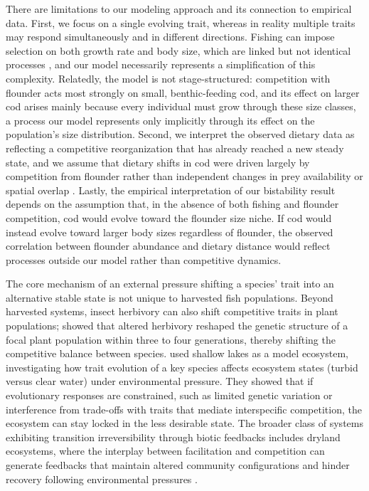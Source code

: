 \documentclass[12pt]{article}
\begin{document}
There are limitations to our modeling approach and its connection to empirical data. First, we focus on a single evolving trait, whereas in reality multiple traits may respond simultaneously and in different directions. Fishing can impose selection on both growth rate and body size, which are linked but not identical processes \citep{Rubalcaba2020}, and our model necessarily represents a simplification of this complexity. Relatedly, the model is not stage-structured: competition with flounder acts most strongly on small, benthic-feeding cod, and its effect on larger cod arises mainly because every individual must grow through these size classes, a process our model represents only implicitly through its effect on the population's size distribution. Second, we interpret the observed dietary data as reflecting a competitive reorganization that has already reached a new steady state, and we assume that dietary shifts in cod were driven largely by competition from flounder rather than independent changes in prey availability or spatial overlap \citep{Enberg2012}. Lastly, the empirical interpretation of our bistability result depends on the assumption that, in the absence of both fishing and flounder competition, cod would evolve toward the flounder size niche. If cod would instead evolve toward larger body sizes regardless of flounder, the observed correlation between flounder abundance and dietary distance would reflect processes outside our model rather than competitive dynamics.

The core mechanism of an external pressure shifting a species' trait into an alternative stable state is not unique to harvested fish populations. Beyond harvested systems, insect herbivory can also shift competitive traits in plant populations; \citet{agrawal2012insect} showed that altered herbivory reshaped the genetic structure of a focal plant population within three to four generations, thereby shifting the competitive balance between species. \cite{chaparro2021adaptive} used shallow lakes as a model ecosystem, investigating how trait evolution of a key species affects ecosystem states (turbid versus clear water) under environmental pressure. They showed that if evolutionary responses are constrained, such as limited genetic variation or interference from trade-offs with traits that mediate interspecific competition, the ecosystem can stay locked in the less desirable state.  The broader class of systems exhibiting transition irreversibility through biotic feedbacks includes dryland ecosystems, where the interplay between facilitation and competition can generate feedbacks that maintain altered community configurations and hinder recovery following environmental pressures \citep{kefi2008evolution, pichon2024interplay}.
\end{document}
